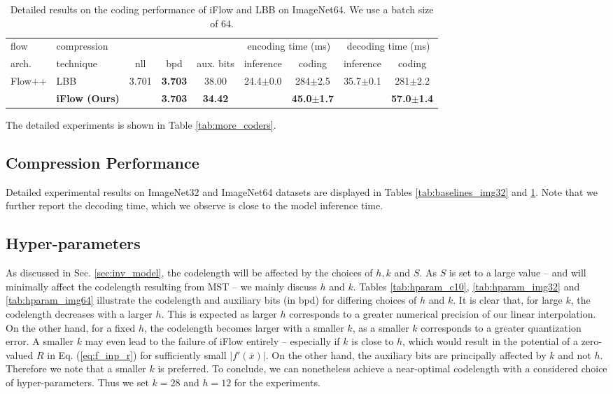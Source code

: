 \documentclass{article}
\newcommand{\ebar}[1]{{\tiny $\pm$#1}}
\begin{document}
\begin{table}[h]
\centering
\small
\caption{Detailed results on the coding performance of iFlow and LBB on ImageNet64. We use a batch size of 64.}
\label{tab:baselines_img64}
\begin{tabular}{llccccccc}
\toprule
flow & compression & & & & \multicolumn{2}{c}{encoding time (ms)} & \multicolumn{2}{c}{decoding time (ms)}\\
arch. & technique & nll & bpd & aux. bits & inference & coding &  inference & coding \\
\midrule
\multirow{2}{*}{Flow++} & LBB~\cite{ho2019compression} & \multirow{2}{*}{3.701} & \textbf{3.703} & 38.00 & \multirow{2}{*}{24.4\ebar{0.0}} & 284\ebar{2.5} & \multirow{2}{*}{35.7\ebar{0.1}} & 281\ebar{2.2} \\
 & \textbf{iFlow (Ours)} & & \textbf{3.703} & \textbf{34.42} & & \textbf{45.0\ebar{1.7}} & & \textbf{57.0\ebar{1.4}} \\
\bottomrule
\end{tabular}
\end{table}

The detailed experiments is shown in Table \ref{tab:more_coders}.

\subsection{Compression Performance}

Detailed experimental results on ImageNet32 and ImageNet64 datasets are displayed in Tables \ref{tab:baselines_img32} and \ref{tab:baselines_img64}. Note that we further report the decoding time, which we observe is close to the model inference time.

\subsection{Hyper-parameters}

As discussed in Sec. \ref{sec:inv_model}, the codelength will be affected by the choices of $h, k$ and $S$. As $S$ is set to a large value -- and will minimally affect the codelength resulting from MST -- we mainly discuss $h$ and $k$. Tables \ref{tab:hparam_c10}, \ref{tab:hparam_img32} and \ref{tab:hparam_img64} illustrate the codelength and auxiliary bits (in bpd) for differing choices of $h$ and $k$. It is clear that, for large $k$, the codelength decreases with a larger $h$. This is expected as larger $h$ corresponds to a greater numerical precision of our linear interpolation. On the other hand, for a fixed $h$, the codelength becomes larger with a smaller $k$, as a smaller $k$ corresponds to a greater quantization error. A smaller $k$ may even lead to the failure of iFlow entirely -- especially if $k$ is close to $h$, which would result in the potential of a zero-valued $R$ in Eq. (\ref{eq:f_inp_r}) for sufficiently small $|f'(\bar{x})|$. On the other hand, the auxiliary bits are principally affected by $k$ and not $h$. Therefore we note that a smaller $k$ is preferred. To conclude, we can nonetheless achieve a near-optimal codelength with a considered choice of hyper-parameters. Thus we set $k = 28$ and $h = 12$ for the experiments.
\end{document}
